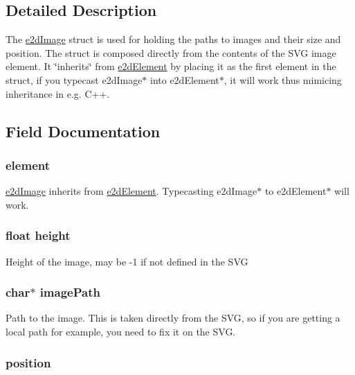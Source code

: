 \subsection{Detailed Description}
The \hyperlink{structe2dImage}{e2d\-Image} struct is used for holding the paths to images and their size and position. The struct is composed directly from the contents of the S\-V\-G image element. It \char`\"{}inherits\char`\"{} from \hyperlink{structe2dElement}{e2d\-Element} by placing it as the first element in the struct, if you typecast e2d\-Image$\ast$ into e2d\-Element$\ast$, it will work thus mimicing inheritance in e.\-g. C++. 

\subsection{Field Documentation}
\hypertarget{structe2dImage_a55bc7a3a0af41fba9e5b91f390c5928c}{
\subsubsection[{element}]{ {\bf element}}}\label{structe2dImage_a55bc7a3a0af41fba9e5b91f390c5928c}
\hyperlink{structe2dImage}{e2d\-Image} inherits from \hyperlink{structe2dElement}{e2d\-Element}. Typecasting e2d\-Image$\ast$ to e2d\-Element$\ast$ will work. \hypertarget{structe2dImage_a48083b65ac9a863566dc3e3fff09a5b4}{
\subsubsection[{height}]{\setlength{\rightskip}{0pt plus 5cm}float {\bf height}}}\label{structe2dImage_a48083b65ac9a863566dc3e3fff09a5b4}
Height of the image, may be -\/1 if not defined in the S\-V\-G \hypertarget{structe2dImage_afb14ab23ba86115c3b01ad4122943f89}{
\subsubsection[{image\-Path}]{\setlength{\rightskip}{0pt plus 5cm}char$\ast$ {\bf image\-Path}}}\label{structe2dImage_afb14ab23ba86115c3b01ad4122943f89}
Path to the image. This is taken directly from the S\-V\-G, so if you are getting a local path for example, you need to fix it on the S\-V\-G. \hypertarget{structe2dImage_afa8983f25fd6aa6aca18feb07d8d2249}{
\subsubsection[{position}]{ {\bf position}}}\label{structe2dImage_afa8983f25fd6aa6aca18feb07d8d2249}
